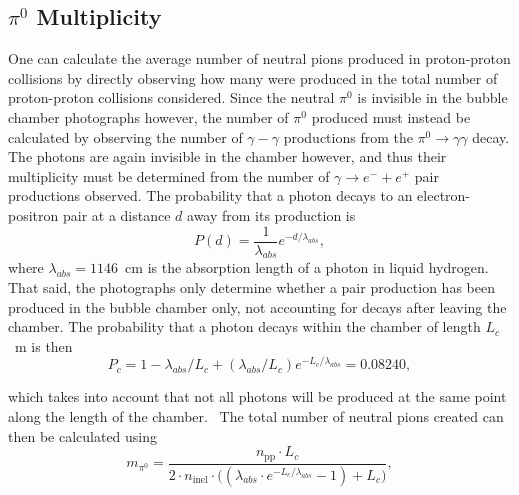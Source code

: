 \documentclass[twocolumn]{article}
\begin{document}
\subsection{$\pi^0$ Multiplicity}
One can calculate the average number of neutral pions produced in proton-proton collisions by directly observing how many were produced in the total number of proton-proton collisions considered. Since the neutral $\pi^0$ is invisible in the bubble chamber photographs however, the number of $\pi^0$ produced must instead be calculated by observing the number of $\gamma-\gamma$ productions from the $\pi^0 \to \gamma \gamma$ decay. The photons are again invisible in the chamber however, and thus their multiplicity must be determined from the number of $\gamma \to e^- + e^+$ pair productions observed. The probability that a photon decays to an electron-positron pair at a distance $d$ away from its production is~\cite{seul}
\begin{equation*}
P(d) = \frac {1} {\lambda_{abs}} e^{-d/\lambda_{abs}},
\end{equation*}
where $\lambda_{abs} = 1146$~cm is the absorption length of a photon in liquid hydrogen. That said, the photographs only determine whether a pair production has been produced in the bubble chamber only, not accounting for decays after leaving the chamber. The probability that a photon decays within the chamber of length $L_c$~m is then
\begin{equation}
P_c = 1-\lambda_{abs}/L_c +  (\lambda_{abs}/L_c) e^{-L_c/\lambda_{abs}} = 0.08240,
\end{equation}
\iffalse
which takes into account that not all photons will be produced at the same point along the length of the chamber.~\cite{seul} By counting the number of pair productions seen for the total amount of proton-proton collisions, the $\pi^0$ multiplicity can be calculated. The multiplicity can also be calculated from the average charged multiplicity of proton-proton collisions, being the average number of charged particles produced in such a collision. Since there are on average four charge particles created per neutral pions in such collisions, the average neutral pion multiplicity can be estimated by dividing the calculated charge multiplicity by four.
\fi
which takes into account that not all photons will be produced at the same point along the length of the chamber.~\cite{seul} The total number of neutral pions created can then be calculated using
\begin{equation} \label{eq:mult}
m_{\pi^0} = \frac{n_{\text{pp}}\cdot L_c}{2\cdot n_{\text{inel}} \cdot \big((\lambda_{abs} \cdot e^{- L_c/\lambda_{abs}}-1)+L_c\big)},
\end{equation}
\end{document}
